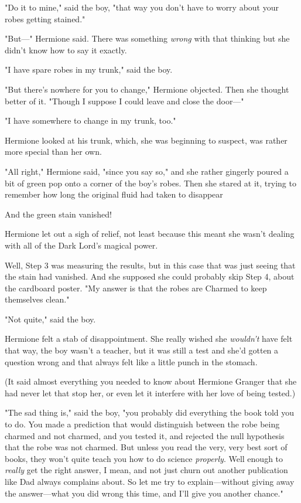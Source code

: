 "Do it to mine," said the boy, "that way you don't have to worry about your
robes getting stained."

"But—" Hermione said. There was something \emph{wrong} with that thinking but
she didn't know how to say it exactly.

"I have spare robes in my trunk," said the boy.

"But there's nowhere for you to change," Hermione objected. Then she thought
better of it. "Though I suppose I could leave and close the door—"

"I have somewhere to change in my trunk, too."

Hermione looked at his trunk, which, she was beginning to suspect, was rather
more special than her own.

"All right," Hermione said, "since you say so," and she rather gingerly poured
a bit of green pop onto a corner of the boy's robes. Then she stared at it,
trying to remember how long the original fluid had taken to disappear{\el}

And the green stain vanished!

Hermione let out a sigh of relief, not least because this meant she wasn't
dealing with all of the Dark Lord's magical power.

Well, Step 3 was measuring the results, but in this case that was just seeing
that the stain had vanished. And she supposed she could probably skip Step 4,
about the cardboard poster. "My answer is that the robes are Charmed to keep
themselves clean."

"Not quite," said the boy.

Hermione felt a stab of disappointment. She really wished she \emph{wouldn't}
have felt that way, the boy wasn't a teacher, but it was still a test and she'd
gotten a question wrong and that always felt like a little punch in the stomach.

(It said almost everything you needed to know about Hermione Granger that she
had never let that stop her, or even let it interfere with her love of being
tested.)

"The sad thing is," said the boy, "you probably did everything the book told
you to do. You made a prediction that would distinguish between the robe being
charmed and not charmed, and you tested it, and rejected the null hypothesis
that the robe was not charmed. But unless you read the very, very best sort of
books, they won't quite teach you how to do science \emph{properly}. Well
enough to \emph{really} get the right answer, I mean, and not just churn out
another publication like Dad always complains about. So let me try to
explain—without giving away the answer—what you did wrong this time, and
I'll give you another chance."

